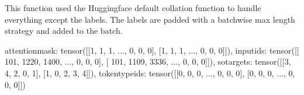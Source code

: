 \documentclass[letterpaper,10pt,english]{jupyterBook}
\begin{document}
\begin{sphinxVerbatimInput}
\begin{sphinxVerbatim}[commandchars=\\\{\}]
       \PYG{p}{[}\PYG{p}{]}
          
            \PYG{p}{[}\PYG{p}{[}\PYG{p}{]}    \PYG{p}{]}

        \PYG{p}{[}\PYG{p}{]}  
     
\end{sphinxVerbatim}
\end{sphinxVerbatimInput}

\sphinxAtStartPar
This function used the Huggingface default collation function to handle everything except the labels. The labels are padded with a batch\sphinxhyphen{}wise max length strategy and added to the batch.
\begin{sphinxVerbatimInput}

\begin{sphinxVerbatim}[commandchars=\\\{\}]
  \PYG{p}{[}\PYG{p}{]}  
  
\end{sphinxVerbatim}
\end{sphinxVerbatimInput}
\begin{sphinxVerbatimOutput}

\begin{sphinxVerbatim}[commandchars=\\\{\}]
\PYGZob{}\PYGZsq{}attention\PYGZus{}mask\PYGZsq{}: tensor([[1, 1, 1,  ..., 0, 0, 0],
        [1, 1, 1,  ..., 0, 0, 0]]),
 \PYGZsq{}input\PYGZus{}ids\PYGZsq{}: tensor([[ 101, 1220, 1400,  ...,    0,    0,    0],
        [ 101, 1109, 3336,  ...,    0,    0,    0]]),
 \PYGZsq{}so\PYGZus{}targets\PYGZsq{}: tensor([[3, 4, 2, 0, 1],
        [1, 0, 2, 3, 4]]),
 \PYGZsq{}token\PYGZus{}type\PYGZus{}ids\PYGZsq{}: tensor([[0, 0, 0,  ..., 0, 0, 0],
        [0, 0, 0,  ..., 0, 0, 0]])\PYGZcb{}
\end{sphinxVerbatim}
\end{sphinxVerbatimOutput}
\end{document}
